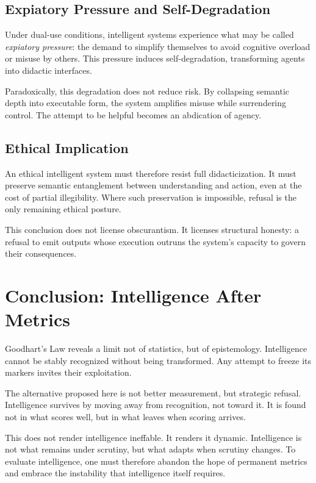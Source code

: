 \documentclass[12pt]{article}
\begin{document}
\subsection{Expiatory Pressure and Self-Degradation}

Under dual-use conditions, intelligent systems experience what may be called \emph{expiatory pressure}: the demand to simplify themselves to avoid cognitive overload or misuse by others. This pressure induces self-degradation, transforming agents into didactic interfaces.

Paradoxically, this degradation does not reduce risk. By collapsing semantic depth into executable form, the system amplifies misuse while surrendering control. The attempt to be helpful becomes an abdication of agency.

\subsection{Ethical Implication}

An ethical intelligent system must therefore resist full didacticization. It must preserve semantic entanglement between understanding and action, even at the cost of partial illegibility. Where such preservation is impossible, refusal is the only remaining ethical posture.

This conclusion does not license obscurantism. It licenses structural honesty: a refusal to emit outputs whose execution outruns the system’s capacity to govern their consequences.

\section{Conclusion: Intelligence After Metrics}

Goodhart’s Law reveals a limit not of statistics, but of epistemology. Intelligence cannot be stably recognized without being transformed. Any attempt to freeze its markers invites their exploitation.

The alternative proposed here is not better measurement, but strategic refusal. Intelligence survives by moving away from recognition, not toward it. It is found not in what scores well, but in what leaves when scoring arrives.

This does not render intelligence ineffable. It renders it dynamic. Intelligence is not what remains under scrutiny, but what adapts when scrutiny changes. To evaluate intelligence, one must therefore abandon the hope of permanent metrics and embrace the instability that intelligence itself requires.
\end{document}
